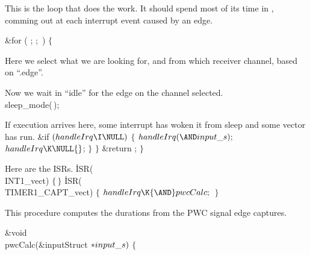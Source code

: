 This is the loop that does the work. It should spend most of its time in
, comming out at each interrupt event caused by an edge.

\Y\B\&{for} ( ;  ; \,) $\{{}$\Y\par
\fi

Here we select what we are looking for, and from which receiver channel,
based on ``.edge''.
\Y\B\par
\fi

Now we wait in ``idle'' for the edge on the channel selected.
\Y\B\\{sleep\_mode}(\,);\par
\fi

If execution arrives here, some interrupt has woken it from sleep and some
vector has run.
\Y\B\&{if} ${}(\\{handleIrq}\I\NULL){}$\5
${}\{{}$\1\7
${}\\{handleIrq}({\AND}\\{input\_s});{}$\6
${}\\{handleIrq}\K\NULL{}$;\6
\4${}\}{}$\2\7
$\}{}$\7
\&{return} ;\7
$\}{}$\par
\fi

Here are the ISRs.
\Y\B\.{ISR}(\\{INT1\_vect})\1\1\2\2\6
${}\{\,\}{}$\7
\.{ISR}(\\{TIMER1\_CAPT\_vect})\1\1\2\2\6
${}\{{}$\1\6
${}\\{handleIrq}\K{\AND}\\{pwcCalc};{}$\6
\4${}\}{}$\2\par
\fi

This procedure computes the durations from the PWC signal edge captures.

\Y\B\&{void} \\{pwcCalc}(\&{inputStruct} ${}{*}\\{input\_s}){}$\1\1 $\{{}$\Y\par
\fi

